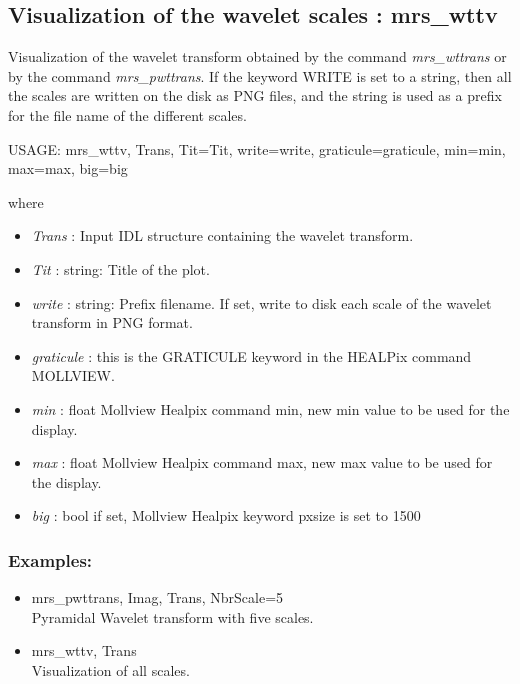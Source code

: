 \subsection{Visualization of the wavelet scales : mrs\_wttv}
Visualization of the wavelet transform obtained by the command {\em mrs\_wttrans} or by the command {\em mrs\_pwttrans}. 
If the keyword WRITE is set to a string, then all the scales are written on the disk as PNG files, and the string is used 
as a prefix for the file name of the different scales.
{\bf
\begin{center}
     USAGE:  mrs\_wttv, Trans, Tit=Tit, write=write, graticule=graticule, min=min, max=max, big=big
\end{center}}
where
\begin{itemize}
\item {\em Trans} : Input IDL structure containing the wavelet transform.
\item {\em Tit} : string: Title of the plot.
\item {\em write} : string: Prefix filename. If set, write to disk each scale of the wavelet transform in PNG format.
\item {\em graticule} : this is the GRATICULE keyword in the HEALPix command MOLLVIEW.
\item {\em min} : float Mollview Healpix command min, new min value to be used for the display.
\item {\em max} : float Mollview Healpix command max, new max value to be used for the display.
\item {\em big} : bool if set, Mollview Healpix keyword pxsize is set to 1500
\end{itemize}
\subsubsection*{Examples:} 
\begin{itemize}
\item mrs\_pwttrans, Imag, Trans, NbrScale=5 \\
Pyramidal  Wavelet transform with five scales.
\item mrs\_wttv, Trans \\
Visualization of all scales.
\end{itemize}



